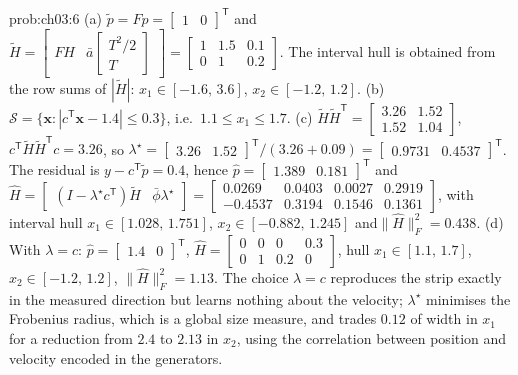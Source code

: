 \documentclass[graybox,envcountchap]{style/SNmono}
\providecommand{\DIFaddbegin}{} %
\providecommand{\DIFaddend}{} %
\begin{document}
\begin{sol}{prob:ch03:6}
(a) $\tilde p=Fp=\begin{bmatrix}1&0\end{bmatrix}^{\mathsf T}$ and\DIFaddbegin \allowbreak \DIFaddend $\tilde H=\begin{bmatrix}FH&\bar a\begin{bmatrix}T^{2}/2\\T\end{bmatrix}\end{bmatrix}=\begin{bmatrix}1&1.5&0.1\\0&1&0.2\end{bmatrix}$. The interval hull is obtained from the row sums of $|\tilde H|$: $x_1\in[-1.6,\,3.6]$, $x_2\in[-1.2,\,1.2]$.
(b) $\mathcal{S}=\{\mathbf{x}:|c^{\mathsf T}\mathbf{x}-1.4|\le0.3\}$, i.e.\ $1.1\le x_1\le1.7$.
(c) $\tilde H\tilde H^{\mathsf T}=\begin{bmatrix}3.26&1.52\\1.52&1.04\end{bmatrix}$, $c^{\mathsf T}\tilde H\tilde H^{\mathsf T}c=3.26$, so $\lambda^{\star}=\begin{bmatrix}3.26&1.52\end{bmatrix}^{\mathsf T}/(3.26+0.09)=\begin{bmatrix}0.9731&0.4537\end{bmatrix}^{\mathsf T}$. The residual is $y-c^{\mathsf T}\tilde p=0.4$, hence $\hat p=\begin{bmatrix}1.389&0.181\end{bmatrix}^{\mathsf T}$ and
$\hat H=\begin{bmatrix}(I-\lambda^{\star}c^{\mathsf T})\tilde H&\bar\phi\lambda^{\star}\end{bmatrix}=\begin{bmatrix}0.0269&0.0403&0.0027&0.2919\\-0.4537&0.3194&0.1546&0.1361\end{bmatrix}$,
with interval hull $x_1\in[1.028,\,1.751]$, $x_2\in[-0.882,\,1.245]$ and\DIFaddbegin \allowbreak \DIFaddend $\|\hat H\|_F^{2}=0.438$.
(d) With $\lambda=c$: $\hat p=\begin{bmatrix}1.4&0\end{bmatrix}^{\mathsf T}$, $\hat H=\begin{bmatrix}0&0&0&0.3\\0&1&0.2&0\end{bmatrix}$, hull $x_1\in[1.1,\,1.7]$, $x_2\in[-1.2,\,1.2]$, $\|\hat H\|_F^{2}=1.13$. The choice $\lambda=c$ reproduces the strip exactly in the measured direction but learns nothing about the velocity; $\lambda^{\star}$ minimises the Frobenius radius, which is a global size measure, and trades $0.12$ of width in $x_1$ for a reduction from $2.4$ to $2.13$ in $x_2$, using the correlation between position and velocity encoded in the generators.

\end{sol}
\end{document}
